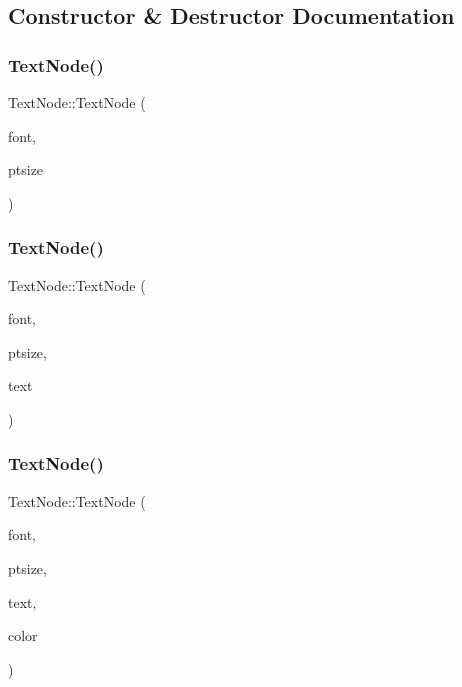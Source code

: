 \subsection{Constructor \& Destructor Documentation}
\mbox{\label{classsage_1_1TextNode_a5fbde25db3407b5e5e84ef297821dec6}} 
\subsubsection{\texorpdfstring{TextNode()}{TextNode()}\hspace{0.1cm}{\footnotesize\ttfamily [1/3]}}
{\footnotesize\ttfamily Text\+Node\+::\+Text\+Node (\begin{DoxyParamCaption}\item[{const std\+::string \&}]{font,  }\item[{int}]{ptsize }\end{DoxyParamCaption})}

\mbox{\label{classsage_1_1TextNode_a9988fa03958e378b3fd612ea3a103649}} 
\subsubsection{\texorpdfstring{TextNode()}{TextNode()}\hspace{0.1cm}{\footnotesize\ttfamily [2/3]}}
{\footnotesize\ttfamily Text\+Node\+::\+Text\+Node (\begin{DoxyParamCaption}\item[{const std\+::string \&}]{font,  }\item[{int}]{ptsize,  }\item[{const std\+::string \&}]{text }\end{DoxyParamCaption})}

\mbox{\label{classsage_1_1TextNode_a5677717ec6c2db9e311a40ad1510adb9}} 
\subsubsection{\texorpdfstring{TextNode()}{TextNode()}\hspace{0.1cm}{\footnotesize\ttfamily [3/3]}}
{\footnotesize\ttfamily Text\+Node\+::\+Text\+Node (\begin{DoxyParamCaption}\item[{const std\+::string \&}]{font,  }\item[{int}]{ptsize,  }\item[{const std\+::string \&}]{text,  }\item[{S\+D\+L\+\_\+\+Color}]{color }\end{DoxyParamCaption})}

